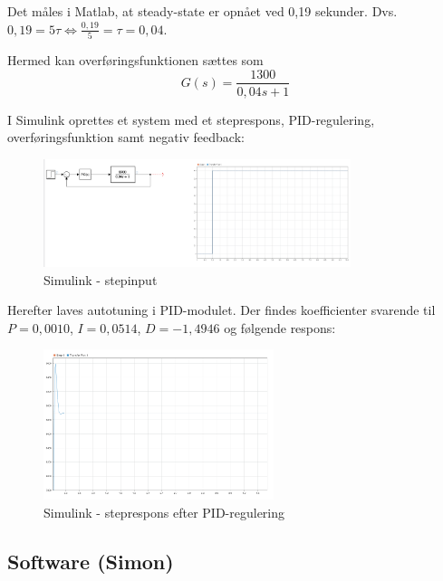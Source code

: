 Det måles i Matlab, at steady-state er opnået ved 0,19 sekunder. Dvs. $0,19 = 5\tau \Leftrightarrow \frac{0,19}{5}=\tau=0,04$.

Hermed kan overføringsfunktionen sættes som
\begin{equation}
  \label{eq:1}
G(s) = \frac{1300}{0,04s+1}  
\end{equation}


I Simulink oprettes et system med et steprespons, PID-regulering, overføringsfunktion samt negativ feedback:

\begin{figure}[h]
  \centering
  \includegraphics[width=0.8\textwidth]{./figurer/sbil1.png}
  \caption{Simulink - stepinput}
  \label{fig:sbil1}
\end{figure}

Herefter laves autotuning i PID-modulet. Der findes koefficienter svarende til $P=0,0010$, $I=0,0514$, $D=-1,4946$ og følgende respons:
\clearpage
\begin{figure}[h]
  \centering
  \includegraphics[width=0.6\textwidth]{./figurer/sbil2.png}
  \caption{Simulink - steprespons efter PID-regulering}
  \label{fig:sbil1}
\end{figure}

\subsection{Software (Simon)}
\label{sec:software-1}

